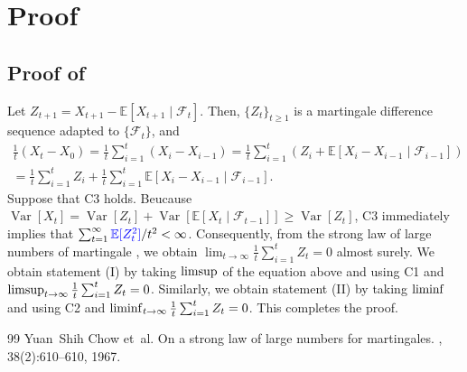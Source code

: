 \documentclass[10pt,a4paper]{amsart}
\theoremstyle{plain}
\DeclareMathOperator{\Var}{Var}
\providecommand{\E}{\mathbb{E}}
\providecommand{\limsup}{\operatornamewithlimits{limsup}}
\providecommand{\liminf}{\operatornamewithlimits{liminf}}
\begin{document}
\section{Proof}

\subsection{Proof of }\label{apdx:prop:convergence_rate}
Let $Z_{t+1} = X_{t+1} - \E[X_{t+1} \mid \mathcal{F}_t]$.
Then, $\{Z_{t}\}_{t \geq 1}$ is a martingale difference sequence adapted to $\{\mathcal{F}_{t}\}$, and
\begin{multline}
\frac1t (X_t - X_0)
= \frac1t \sum_{i=1}^{t}(X_i - X_{i-1})
= \frac1t \sum_{i=1}^{t}(Z_i + \E[X_i - X_{i-1} \mid \mathcal{F}_{i-1}])
\\
= \frac1t \sum_{i=1}^{t}Z_i + \frac1t \sum_{i=1}^{t} \E[X_i - X_{i-1} \mid \mathcal{F}_{i-1}]
.
\end{multline}
Suppose that C3 holds.
{\color{blue}Beucause $\Var[X_t] = \Var[Z_t] + \Var[\E[X_t\mid\mathcal{F}_{t-1}]] \geq \Var[Z_t]$, }
C3 immediately implies that $\sum_{t=1}^{\infty}{\color{blue}\E[Z_{t}^2]} / t^2 < \infty$. Consequently, from the strong law of large numbers of martingale \cite{chow1967strong}, we obtain $\lim_{t\to\infty} \frac1t \sum_{i=1}^{t} Z_t = 0$ almost surely. 
We obtain statement (I) by taking $\limsup$ of the equation above and using C1 and $\limsup_{t\to\infty} \frac1t \sum_{i=1}^{t} Z_t = 0$.
Similarly, we obtain statement (II) by taking $\liminf$ and using C2 and $\liminf_{t\to\infty} \frac1t \sum_{i=1}^{t} Z_t = 0$. This completes the proof.

\begin{thebibliography}{99}
 Yuan~Shih Chow et~al.
\newblock On a strong law of large numbers for martingales.
, 38(2):610--610, 1967.
\end{thebibliography}
\end{document}

